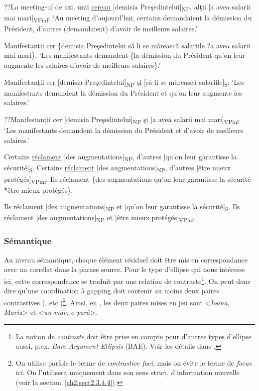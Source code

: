 \ex ??La meeting-ul de azi, unii \uline{cereau} [demisia Preşedintelui]\textsubscript{NP}, alţii [a avea salarii mai mari]\textsubscript{VPinf}.
\glt ‘Au meeting d’aujourd’hui, certains demandaient la démission du Président, d’autres (demandaient) d’avoir de meilleurs salaires.’

\ex Manifestanții cer \{demisia Preşedintelui {\textbar} să li se mărească salariile {\textbar} ?a avea salarii mai mari\}.
\glt ‘Les manifestants demandent \{la démission du Président {\textbar} qu’on leur augmente les salaires {\textbar} d’avoir de meilleurs salaires\}.’
\z
\z


\ea \label{ch2:ex144}
\ea Manifestanții cer [demisia Preşedintelui]\textsubscript{NP} şi [să li se mărească salariile]\textsubscript{S}.
\glt ‘Les manifestants demandent la démission du Président et qu’on leur augmente les salaires.’

\ex ??Manifestanții cer [demisia Preşedintelui]\textsubscript{NP} şi [a avea salarii mai mari]\textsubscript{VPinf}.
\glt ‘Les manifestants demandent la démission du Président et d’avoir de meilleurs salaires.’ 
\z
\z


\ea \label{ch2:ex145}
\ea Certains \uline{réclament} [des augmentations]\textsubscript{NP}, d’autres [qu’on leur garantisse la sécurité]\textsubscript{S}.
\ex *Certains \uline{réclament} [des augmentations]\textsubscript{NP}, d’autres [être mieux protégés]\textsubscript{VPinf}.
\ex Ils réclament \{des augmentations {\textbar} qu’on leur garantisse la sécurité {\textbar} *être mieux protégés\}.
\z
\z

\ea \label{ch2:ex146}
\ea Ils réclament [des augmentations]\textsubscript{NP} et [qu’on leur garantisse la sécurité]\textsubscript{S}.
\ex *Ils réclament [des augmentations]\textsubscript{NP} et [être mieux protégés]\textsubscript{VPinf}.
\z
\z


\subsubsection{Sémantique} \label{ch2:sect2.3.4.2}


Au niveau sémantique, chaque élément résiduel doit être mis en correspondance avec un corrélat dans la phrase source. Pour le type d’ellipse qui nous intéresse ici, cette correspondance se traduit par une relation de contraste\footnote{La notion de \textit{contraste} doit être prise en compte pour d’autres types d’ellipse aussi, p.ex. \textit{Bare Argument Ellipsis} (BAE). Voir les détails dans \citet{KonietzkoEtAl2010}.}. On peut donc dire qu’une coordination à gapping doit contenir au moins deux paires contrastives (\citealt{Kuno1976,Sag1976,Hartmann2000,FeryEtAl2005,Winkler2005,Repp2009}, etc.)\footnote{
 On utilise parfois le terme de \textit{contrastive foci}, mais on évite le terme de \textit{focus} ici. On l’utilisera uniquement dans son sens strict, d’information nouvelle (voir la section~\ref{ch2:sect2.3.4.4}).}. Ainsi, en , les deux paires mises en jeu sont <\textit{Ioana, Maria}> et <\textit{un măr, o pară}>.

